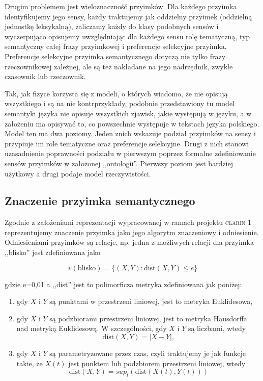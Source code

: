 \documentclass[a4paper, 12pt]{article}
\theoremstyle{remark}
\begin{document}
Drugim problemem jest wieloznaczność przyimków. Dla każdego przyimka identyfikujemy jego sensy, każdy traktujemy jak oddzielny przyimek (oddzielną jednostkę leksykalną), zaliczamy każdy do klasy podobnych sensów i wyczerpująco opisujemy uwzględniając dla każdego sensu
rolę tematyczną, 
typ semantyczny całej frazy przyimkowej
i preferencje selekcyjne przyimka.
Preferencje selekcyjne przyimka semantycznego dotyczą nie tylko frazy rzeczownikowej zależnej, ale są też nakładane na jego nadrzędnik, zwykle czasownik lub rzeczownik. 

Tak, jak fizyce korzysta się z modeli, o których wiadomo, że nie opisują wszystkiego i są na nie kontrprzykłady, podobnie przedstawiony tu model semantyki języka nie opisuje wszystkich zjawisk, jakie występują w języku, a w założeniu ma opisywać to, co powszechnie występuje w tekstach języka polskiego. Model ten ma dwa poziomy. Jeden znich wskazuje podział przyimków na sensy i przypiuje im role tematyczne oraz preferencje selekcyjne. Drugi z nich stanowi uzasadnienie poprawności podziału w pierwszym poprzez formalne zdefiniowanie sensów przyimków w założonej ,,ontologii''. Pierwszy poziom jest bardziej użytkowy a drugi podaje model rzeczywistości.

\subsection{Znaczenie przyimka semantycznego} %
\label{sub:znaczenie_przyimka_semantycznego}

Zgodnie z założeniami reprezentacji wypracowanej w ramach projektu \textsc{clarin 1} reprezentujemy znaczenie przyimka jako jego algorytm znaczeniowy i odniesienie.
Odniesieniami przyimków są relacje, np. jedna z możliwych relacji dla przyimka ,,blisko'' jest zdefiniowana jako

\begin{equation}
v(\text{blisko})=\{(X,Y):\text{dist}(X,Y) \leq e\}
\end{equation}

gdzie e=0,01 a ,,dist'' jest to polimorficza metryka zdefiniowana jak poniżej:
\begin{enumerate}
\item gdy $X$ i $Y$ są punktami w przestrzeni liniowej, jest to metryka Euklidesowa,
\item gdy $X$ i $Y$ są podzbiorami przestrzeni liniowej, jest to metryka Hausdorffa nad metryką Euklidesową.
W szczególności, gdy $X$ i $Y$ są liczbami, wtedy
\begin{equation}
 \text{dist}(X,Y) = |X - Y|,
\end{equation}
\item gdy $X$ i $Y$ są parametryzowane przez czas, czyli traktujemy je jak funkcje takie, że $X(t)$ jest punktem lub podzbiorem przestrzeni liniowej, wtedy
\begin{equation}
 \text{dist}(X,Y) = sup_t(\text{dist}(X(t),Y(t)))
\end{equation}
\end{enumerate}
\end{document}
